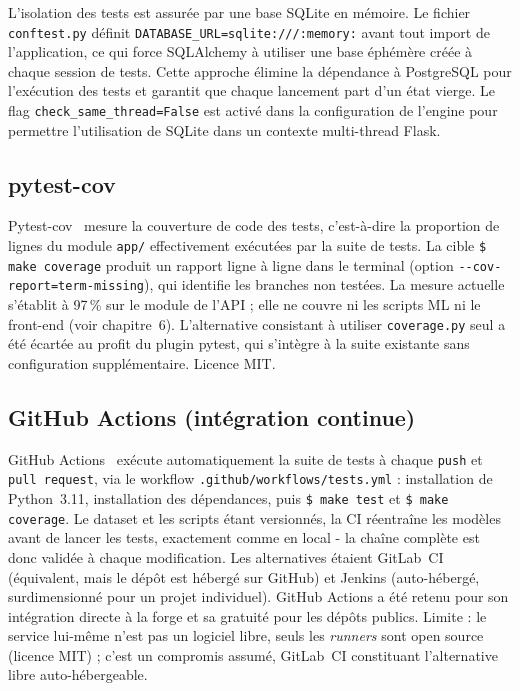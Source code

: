 \documentclass[12pt,a4paper,openany]{report}
\newcommand{\file}[1]{\texttt{#1}}
\newcommand{\cmd}[1]{\texttt{\$ #1}}
\begin{document}
L'isolation des tests est assurée par une base SQLite en mémoire. Le fichier \file{conftest.py} définit \texttt{DATABASE\_URL=sqlite:///:memory:} avant tout import de l'application, ce qui force SQLAlchemy à utiliser une base éphémère créée à chaque session de tests. Cette approche élimine la dépendance à PostgreSQL pour l'exécution des tests et garantit que chaque lancement part d'un état vierge. Le flag \texttt{check\_same\_thread=False} est activé dans la configuration de l'engine pour permettre l'utilisation de SQLite dans un contexte multi-thread Flask.

\subsection{pytest-cov}

Pytest-cov~\cite{pytest-cov} mesure la couverture de code des tests, c'est-à-dire la proportion de lignes du module \file{app/} effectivement exécutées par la suite de tests. La cible \cmd{make coverage} produit un rapport ligne à ligne dans le terminal (option \texttt{-{}-cov-report=term-missing}), qui identifie les branches non testées. La mesure actuelle s'établit à 97\,\% sur le module de l'API ; elle ne couvre ni les scripts ML ni le front-end (voir chapitre~6). L'alternative consistant à utiliser \texttt{coverage.py} seul a été écartée au profit du plugin pytest, qui s'intègre à la suite existante sans configuration supplémentaire. Licence MIT.

\subsection{GitHub Actions (intégration continue)}

GitHub Actions~\cite{github-actions} exécute automatiquement la suite de tests à chaque \texttt{push} et \texttt{pull request}, via le workflow \file{.github/workflows/tests.yml} : installation de Python~3.11, installation des dépendances, puis \cmd{make test} et \cmd{make coverage}. Le dataset et les scripts étant versionnés, la CI réentraîne les modèles avant de lancer les tests, exactement comme en local - la chaîne complète est donc validée à chaque modification. Les alternatives étaient GitLab~CI (équivalent, mais le dépôt est hébergé sur GitHub) et Jenkins (auto-hébergé, surdimensionné pour un projet individuel). GitHub Actions a été retenu pour son intégration directe à la forge et sa gratuité pour les dépôts publics. Limite : le service lui-même n'est pas un logiciel libre, seuls les \emph{runners} sont open source (licence MIT) ; c'est un compromis assumé, GitLab~CI constituant l'alternative libre auto-hébergeable.
\end{document}
